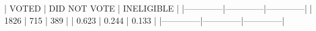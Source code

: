 \begin{Schunk}
\begin{Soutput}
 
             |        VOTED | DID NOT VOTE |   INELIGIBLE | 
             |--------------|--------------|--------------|
             |         1826 |          715 |          389 | 
             |        0.623 |        0.244 |        0.133 | 
             |--------------|--------------|--------------|
\end{Soutput}
\end{Schunk}
